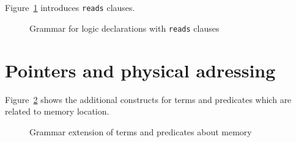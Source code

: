 

\subsection{}
\label{sec:reads}
\experimental

\nodiff

Figure~\ref{fig:gram:logicreads} introduces \lstinline|reads| clauses.

\begin{figure}[htp]
  \begin{cadre}
      
    \end{cadre}
  \caption{Grammar for logic declarations with \lstinline|reads| clauses}
\label{fig:gram:logicreads}
\end{figure}



\subsection{}
\label{sec:specmodules}
\nodiff


\section{Pointers and physical adressing}
\label{sec:pointers}

\nodiff

Figure~\ref{fig:gram:memory} shows the additional constructs for terms and
predicates which are related to memory location.
\begin{figure}[htbp]
  \caption{Grammar extension of terms and predicates about memory}
\label{fig:gram:memory}
\end{figure}

